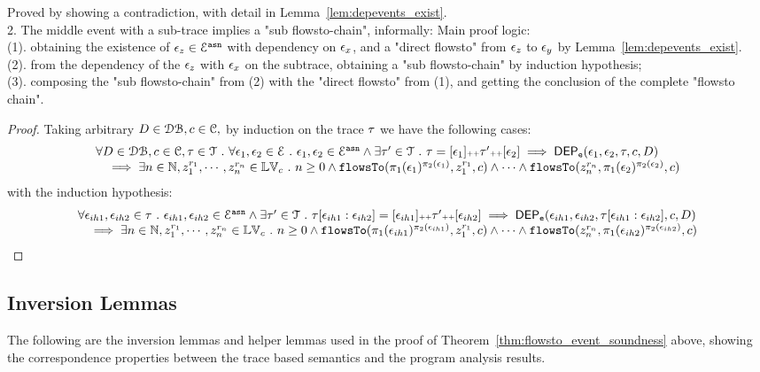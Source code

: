 Proved by showing a contradiction, with detail in Lemma~\ref{lem:depevents_exist}.
%
\\
2. The middle event with a sub-trace implies a "sub flowsto-chain", informally:
%
%
Main proof logic:
\\
(1). obtaining the existence of $\mathtt{\epsilon}_z \in \mathcal{E}^{\mathtt{{asn}}} $ with dependency on $\mathtt{\epsilon}_x$, and a "direct flowsto" from $\mathtt{\epsilon}_z$ to $\mathtt{\epsilon}_y$
by Lemma~\ref{lem:depevents_exist}.
 \\
(2). from the dependency of the $\mathtt{\epsilon}_z$ with $\mathtt{\epsilon}_x$ on the subtrace,
 obtaining a "sub flowsto-chain" by induction  hypothesis;
 \\
(3). composing the "sub flowsto-chain" from (2) with the  "direct flowsto" from (1), and getting the conclusion of
 the complete "flowsto chain".
%
\begin{proof}
  Taking arbitrary $D \in \mathcal{DB} , c \in \mathcal{C},$ by induction on the trace $\mathtt{\tau}$ we have the following cases:
  \[
    \begin{array}{l}
      \forall D \in \mathcal{DB} , c \in \mathcal{C}, \mathtt{\tau} \in \mathcal{T} ~.~ \forall \mathtt{\epsilon}_1, \mathtt{\epsilon}_2 \in \mathcal{E} ~.~
      \mathtt{\epsilon}_1, \mathtt{\epsilon}_2 \in \mathcal{E}^{\mathtt{{asn}}} \land 
       \exists \mathtt{\tau}' \in \mathcal{T} ~.~ \mathtt{\tau} = [\mathtt{\epsilon}_1] {\scriptscriptstyle ++} \mathtt{\tau}' {\scriptscriptstyle ++} [\mathtt{\epsilon}_2]
      \implies
      \mathsf{DEP_{\mathtt{e}}}(\mathtt{\epsilon}_1, \mathtt{\epsilon}_2, \mathtt{\tau}, c, D) 
      \\ \quad 
      \implies 
      \exists n \in \mathbb{N}, z_1^{r_1}, \cdots, z_n^{r_n} \in \mathbb{LV}_{{c}} ~.~ n \geq 0 \land
      \mathtt{flowsTo}(\pi_1(\mathtt{\epsilon}_1)^{\pi_2(\mathtt{\epsilon}_1)},  z_1^{r_1}, c) 
      \land \cdots \land \mathtt{flowsTo}(z_n^{r_n}, \pi_1(\mathtt{\epsilon}_2)^{\pi_2(\mathtt{\epsilon}_2)}, c) 
    \end{array}
  \]
  with the induction hypothesis:
  \[
    \begin{array}{l}
      \forall \mathtt{\epsilon}_{ih1}, \mathtt{\epsilon}_{ih2} \in \mathtt{\tau} ~.~ \mathtt{\epsilon}_{ih1}, \mathtt{\epsilon}_{ih2} \in \mathcal{E}^{\mathtt{{asn}}} 
      \land
       \exists \mathtt{\tau}' \in \mathcal{T} ~.~ 
       \mathtt{\tau}[\mathtt{\epsilon}_{ih1}:\mathtt{\epsilon}_{ih2}] = [\mathtt{\epsilon}_{ih1}] {\scriptscriptstyle ++} \mathtt{\tau}' {\scriptscriptstyle ++} [\mathtt{\epsilon}_{ih2}]
      \implies
      \mathsf{DEP_{\mathtt{e}}}(\mathtt{\epsilon}_{ih1}, \mathtt{\epsilon}_{ih2}, \mathtt{\tau}[\mathtt{\epsilon}_{ih1}:\mathtt{\epsilon}_{ih2}], c, D) 
      \\ \quad 
      \implies 
      \exists n \in \mathbb{N}, z_1^{r_1}, \cdots, z_n^{r_n} \in \mathbb{LV}_{{c}} ~.~ n \geq 0 \land
      \mathtt{flowsTo}(\pi_1(\mathtt{\epsilon}_{ih1})^{\pi_2(\mathtt{\epsilon}_{ih1})},  z_1^{r_1}, c) 
      \land \cdots \land \mathtt{flowsTo}(z_n^{r_n}, \pi_1(\mathtt{\epsilon}_{ih2})^{\pi_2(\mathtt{\epsilon}_{ih2})}, c) 
    \end{array}
    \]
%
\end{proof}

\subsection{Inversion Lemmas}
The following are the inversion lemmas and helper lemmas used in the proof of Theorem~\ref{thm:flowsto_event_soundness} above,
showing the correspondence properties between the trace based semantics and the program analysis results.
